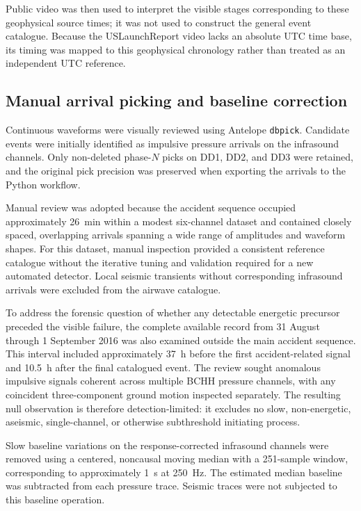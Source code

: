 \documentclass[]{seismica}
\begin{document}
Public video was then used to interpret the visible stages corresponding to
these geophysical source times; it was not used to construct the general event
catalogue. Because the USLaunchReport video lacks an absolute UTC time base,
its timing was mapped to this geophysical chronology rather than treated as an
independent UTC reference.

\subsection{Manual arrival picking and baseline correction}

Continuous waveforms were visually reviewed using Antelope \texttt{dbpick}. Candidate events were initially identified as impulsive pressure arrivals on the infrasound channels. Only non-deleted phase-$N$ picks on DD1, DD2, and DD3 were retained, and the original pick precision was preserved when exporting the arrivals to the Python workflow.

Manual review was adopted because the accident sequence occupied approximately 26~min within a modest six-channel dataset and contained closely spaced, overlapping arrivals spanning a wide range of amplitudes and waveform shapes. For this dataset, manual inspection provided a consistent reference catalogue without the iterative tuning and validation required for a new automated detector. Local seismic transients without corresponding infrasound arrivals were excluded from the airwave catalogue.

To address the forensic question of whether any detectable energetic precursor
preceded the visible failure, the complete available record from 31 August
through 1 September 2016 was also examined outside the main accident sequence.
This interval included approximately 37~h before the first accident-related
signal and 10.5~h after the final catalogued event. The review sought anomalous
impulsive signals coherent across multiple BCHH pressure channels, with any
coincident three-component ground motion inspected separately. The resulting
null observation is therefore detection-limited: it excludes no slow,
non-energetic, aseismic, single-channel, or otherwise subthreshold initiating
process.

Slow baseline variations on the response-corrected infrasound channels were removed using a centered, noncausal moving median with a 251-sample window, corresponding to approximately 1~s at 250~Hz. The estimated median baseline was subtracted from each pressure trace. Seismic traces were not subjected to this baseline operation.
\end{document}
